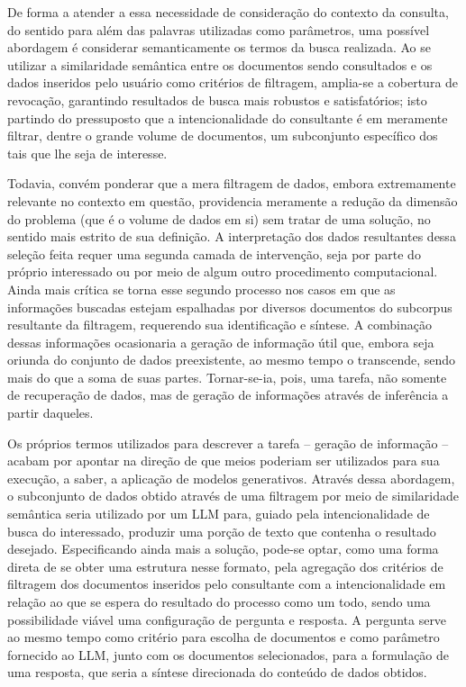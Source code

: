 De forma a atender a essa necessidade de consideração do contexto da consulta, do sentido para além das palavras utilizadas como parâmetros, uma possível abordagem é considerar semanticamente os termos da busca realizada. Ao se utilizar a similaridade semântica entre os documentos sendo consultados e os dados inseridos pelo usuário como critérios de filtragem, amplia-se a cobertura de revocação, garantindo resultados de busca mais robustos e satisfatórios; isto partindo do pressuposto que a intencionalidade do consultante é em meramente filtrar, dentre o grande volume de documentos, um subconjunto específico dos tais que lhe seja de interesse.

Todavia, convém ponderar que a mera filtragem de dados, embora extremamente relevante no contexto em questão, providencia meramente a redução da dimensão do problema (que é o volume de dados em si) sem tratar de uma solução, no sentido mais estrito de sua definição. A interpretação dos dados resultantes dessa seleção feita requer uma segunda camada de intervenção, seja por parte do próprio interessado ou por meio de algum outro procedimento computacional. Ainda mais crítica se torna esse segundo processo nos casos em que as informações buscadas estejam espalhadas por diversos documentos do subcorpus resultante da filtragem, requerendo sua identificação e síntese. A combinação dessas informações ocasionaria a geração de informação útil que, embora seja oriunda do conjunto de dados preexistente, ao mesmo tempo o transcende, sendo mais do que a soma de suas partes. Tornar-se-ia, pois, uma tarefa, não somente de recuperação de dados, mas de geração de informações através de inferência a partir daqueles.

Os próprios termos utilizados para descrever a tarefa – geração de informação – acabam por apontar na direção de que meios poderiam ser utilizados para sua execução, a saber, a aplicação de modelos generativos. Através dessa abordagem, o subconjunto de dados obtido através de uma filtragem por meio de similaridade semântica seria utilizado por um \ac{LLM} para, guiado pela intencionalidade de busca do interessado, produzir uma porção de texto que contenha o resultado desejado. Especificando ainda mais a solução, pode-se optar, como uma forma direta de se obter uma estrutura nesse formato, pela agregação dos critérios de filtragem dos documentos inseridos pelo consultante com a intencionalidade em relação ao que se espera do resultado do processo como um todo, sendo uma possibilidade viável uma configuração de pergunta e resposta. A pergunta serve ao mesmo tempo como critério para escolha de documentos e como parâmetro fornecido ao \ac{LLM}, junto com os documentos selecionados, para a formulação de uma resposta, que seria a síntese direcionada do conteúdo de dados obtidos.


